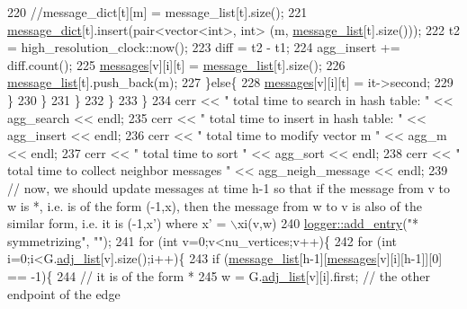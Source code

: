 \begin{DoxyCode}
220             \textcolor{comment}{//message\_dict[t][m] = message\_list[t].size();}
221             \hyperlink{classgraph__message_ab54d89b122c2b1322da0d5db2043fb84}{message\_dict}[t].insert(pair<vector<int>, \textcolor{keywordtype}{int}> (m, 
      \hyperlink{classgraph__message_aa17fdb629b423343edfafa97252763ef}{message\_list}[t].size()));
222             t2 = high\_resolution\_clock::now();
223             diff = t2 - t1;
224             agg\_insert += diff.count();
225             \hyperlink{classgraph__message_aac77e098f0acf9650116a8e51fe3b4b7}{messages}[v][i][t] = \hyperlink{classgraph__message_aa17fdb629b423343edfafa97252763ef}{message\_list}[t].size();
226             \hyperlink{classgraph__message_aa17fdb629b423343edfafa97252763ef}{message\_list}[t].push\_back(m);
227           \}\textcolor{keywordflow}{else}\{
228             \hyperlink{classgraph__message_aac77e098f0acf9650116a8e51fe3b4b7}{messages}[v][i][t] = it->second;
229           \}
230         \}
231       \}
232     \}
233   \}
234   cerr << \textcolor{stringliteral}{" total time to search in hash table: "} << agg\_search << endl;
235   cerr << \textcolor{stringliteral}{" total time to insert in hash table: "} << agg\_insert << endl;
236   cerr << \textcolor{stringliteral}{" total time to modify vector m  "} << agg\_m << endl;
237   cerr << \textcolor{stringliteral}{" total time to sort  "} << agg\_sort << endl;
238   cerr << \textcolor{stringliteral}{" total time to collect neighbor messages "} <<  agg\_neigh\_message << endl;
239   \textcolor{comment}{// now, we should update messages at time h-1 so that if the message from v to w is *, i.e. is of the
       form (-1,x), then the message from w to v is also of the similar form, i.e. it is (-1,x') where x' = \(\backslash\)xi(v,w)}
240   \hyperlink{classlogger_a710163deb17bc81f70d53d285b8ac9ac}{logger::add\_entry}(\textcolor{stringliteral}{"* symmetrizing"}, \textcolor{stringliteral}{""});
241   \textcolor{keywordflow}{for} (\textcolor{keywordtype}{int} v=0;v<nu\_vertices;v++)\{
242     \textcolor{keywordflow}{for} (\textcolor{keywordtype}{int} i=0;i<G.\hyperlink{classmarked__graph_a1a0bf7ca413a278763f7c878b3b6fd6f}{adj\_list}[v].size();i++)\{
243       \textcolor{keywordflow}{if} (\hyperlink{classgraph__message_aa17fdb629b423343edfafa97252763ef}{message\_list}[h-1][\hyperlink{classgraph__message_aac77e098f0acf9650116a8e51fe3b4b7}{messages}[v][i][h-1]][0] == -1)\{
244         \textcolor{comment}{// it is of the form *}
245         w = G.\hyperlink{classmarked__graph_a1a0bf7ca413a278763f7c878b3b6fd6f}{adj\_list}[v][i].first; \textcolor{comment}{// the other endpoint of the edge}

\end{DoxyCode}
